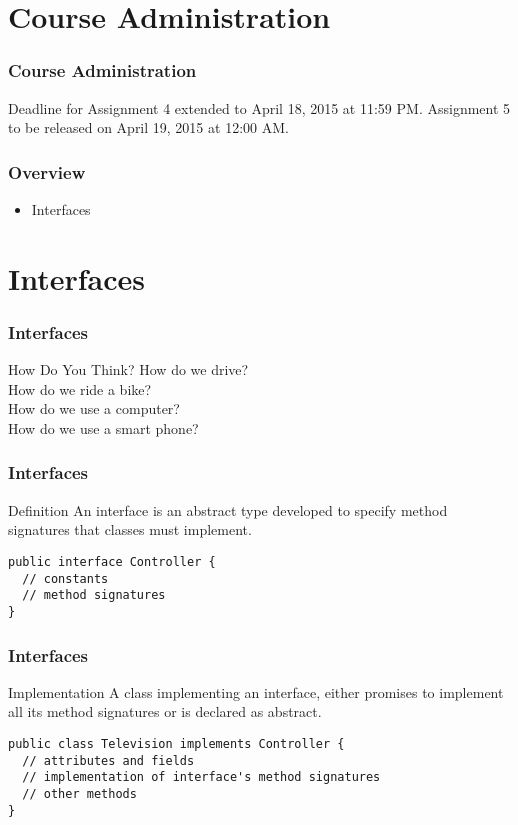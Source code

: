 \documentclass[10pt, compress]{beamer}
\begin{document}
\prepareCover

\section{Course Administration}

\begin{frame}[fragile]
\frametitle{Course Administration}
Deadline for Assignment 4 extended to April 18, 2015 at 11:59 PM.
Assignment 5 to be released on April 19, 2015 at 12:00 AM.
\end{frame}

\begin{frame}[fragile]
  \frametitle{Overview}
  \begin{itemize}
    \item[] Interfaces
  \end{itemize}
\end{frame}

\section{Interfaces}

\begin{frame}[fragile]
  \frametitle{Interfaces}
  \begin{block}{How Do You Think?}
    How do we drive?\\
    How do we ride a bike?\\
    How do we use a computer?\\
    How do we use a smart phone?
  \end{block}
\end{frame}

\begin{frame}[fragile]
  \frametitle{Interfaces}
  \begin{block}{Definition}
    An interface is an abstract type developed to specify method signatures that classes must implement.
    \begin{verbatim}
public interface Controller {
  // constants
  // method signatures
}
    \end{verbatim}
  \end{block}
\end{frame}

\begin{frame}[fragile]
  \frametitle{Interfaces}
  \begin{block}{Implementation}
    A class implementing an interface, either promises to implement all its method signatures or is declared as abstract.
    \begin{verbatim}
public class Television implements Controller {
  // attributes and fields
  // implementation of interface's method signatures
  // other methods
}
    \end{verbatim}
  \end{block}
\end{frame}
\end{document}
